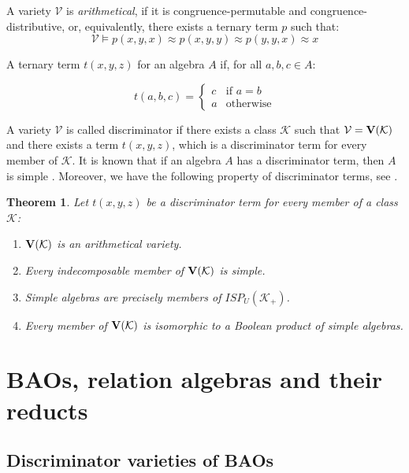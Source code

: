 \documentclass[a4paper]{article}
\theoremstyle{defin}
\theoremstyle{theorem}
\newtheorem{theorem}{Theorem}
\theoremstyle{claim}
\theoremstyle{prop}
\theoremstyle{lemma}
\theoremstyle{fact}
\theoremstyle{ex}
\theoremstyle{col}
\begin{document}
A variety $\mathcal{V}$ is \emph{arithmetical}, if it is congruence-permutable and congruence-distributive, or, equivalently, there exists a ternary term $p$ such that:
\begin{equation}
\mathcal{V} \models p(x,y,x) \approx p(x,y,y) \approx p(y,y,x) \approx x
\end{equation}

A ternary term $t(x, y, z)$ for an algebra $A$ if, for all $a, b, c \in A$:

\begin{equation}
t(a,b,c) =
  \begin{cases}
  c & \text{if $a = b$} \\
  a & \text{otherwise}
  \end{cases}
\end{equation}

A variety $\mathcal{V}$ is called discriminator if there exists a class $\mathcal{K}$ such that $\mathcal{V} = {\bf V}(\mathcal{K})$ and there exists a term $t(x,y,z)$, which is a discriminator term for every member of $\mathcal{K}$. It is known that if an algebra $A$ has a discriminator term, then $A$ is simple \cite[Lemma 9.2]{sankappanavar1981course}. Moreover, we have the following property of discriminator terms, see \cite[Theorem 9.4]{sankappanavar1981course}.

\begin{theorem} Let $t(x,y,z)$ be a discriminator term for every member of a class $\mathcal{K}$:

\begin{enumerate}
\item ${\bf V}(\mathcal{K})$ is an arithmetical variety.
\item Every indecomposable member of ${\bf V}(\mathcal{K})$ is simple.
\item Simple algebras are precisely members of ${ISP}_U(\mathcal{K}_+)$.
\item Every member of ${\bf V}(\mathcal{K})$ is isomorphic to a Boolean product of simple algebras.
\end{enumerate}
\end{theorem}

\section{BAOs, relation algebras and their reducts}

\subsection{Discriminator varieties of BAOs}
\end{document}
